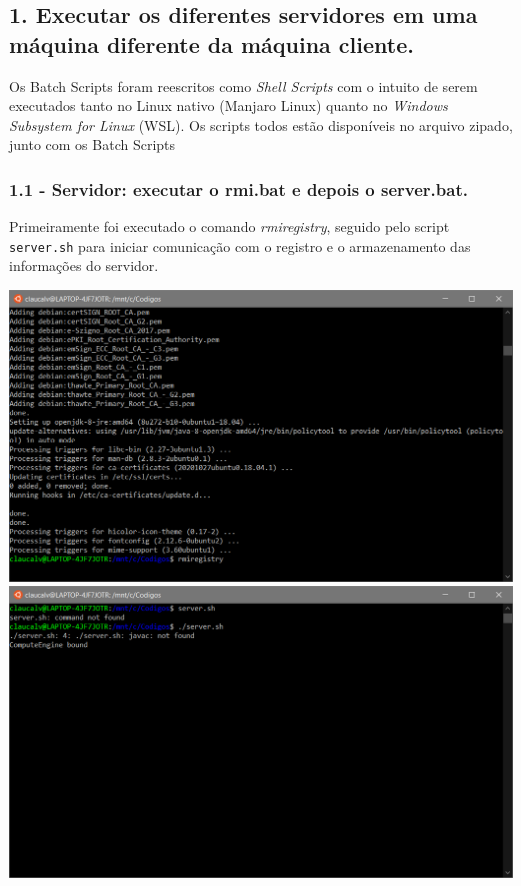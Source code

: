 \subsection*{1. Executar os diferentes servidores em uma máquina diferente da
máquina cliente.}

Os \textit{}{Batch Scripts} foram reescritos como \textit{Shell Scripts} com o intuito de serem executados tanto no Linux nativo (Manjaro Linux) quanto no \textit{Windows Subsystem for Linux} (WSL). Os scripts todos estão disponíveis no arquivo zipado, junto com os Batch Scripts


\subsubsection{1.1 - Servidor: executar o rmi.bat e depois o server.bat.}

Primeiramente foi executado o comando \textit{rmiregistry}, seguido pelo script \texttt{server.sh} para iniciar comunicação com o registro e o armazenamento das informações do servidor.

\vspace{2em}
\begin{minipage}{\textwidth}
    \hspace{-1em}
    \centering
    \includegraphics[scale=.35]{prints/rmiregistry.PNG}
    \hspace{1em}
    \includegraphics[scale=.35]{prints/server.PNG}
    \label{threadspng}
    \hspace{1em}
\end{minipage}
\vspace{0.5em}


